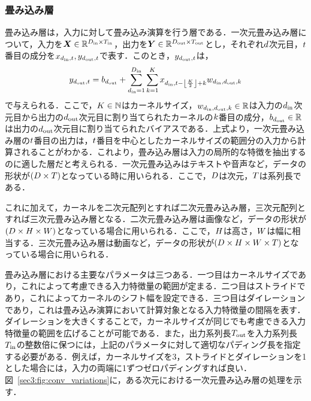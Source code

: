 \subsubsection{畳み込み層}
畳み込み層は，入力に対して畳み込み演算を行う層である．一次元畳み込み層について，入力を$\bm{X} \in \mathbb{R}^{D_{\text{in}} \times T_{\text{in}}}$，出力を$\bm{Y} \in \mathbb{R}^{D_{\text{out}} \times T_{\text{out}}}$とし，それぞれ$d$次元目，$t$番目の成分を$x_{d_{\text{in}}, t}, y_{d_{\text{out}}, t}$で表す．このとき，$y_{d_{\text{out}}, t}$は，
\begin{align}
    y_{d_{\text{out}}, t} = b_{d_{\text{out}}} + \sum_{d_{\text{in}} = 1}^{D_{\text{in}}} \sum_{k = 1}^{K} x_{d_{\text{in}}, t - \left\lfloor\frac{K}{2}\right\rfloor + k} w_{d_{\text{in}}, d_{\text{out}}, k}
\end{align}
で与えられる．ここで，$K \in \mathbb{N}$はカーネルサイズ，$w_{d_{\text{in}}, d_{\text{out}}, k} \in \mathbb{R}$は入力の$d_{\text{in}}$次元目から出力の$d_{\text{out}}$次元目に割り当てられたカーネルの$k$番目の成分，$b_{d_{\text{out}}} \in \mathbb{R}$は出力の$d_{\text{out}}$次元目に割り当てられたバイアスである．上式より，一次元畳み込み層の$t$番目の出力は，$t$番目を中心としたカーネルサイズの範囲分の入力から計算されることがわかる．これより，畳み込み層は入力の局所的な特徴を抽出するのに適した層だと考えられる．一次元畳み込みはテキストや音声など，データの形状が$\left(D \times T\right)$となっている時に用いられる．ここで，$D$は次元，$T$は系列長である．

これに加えて，カーネルを二次元配列とすれば二次元畳み込み層，三次元配列とすれば三次元畳み込み層となる．二次元畳み込み層は画像など，データの形状が$\left(D \times H \times W\right)$となっている場合に用いられる．ここで，$H$は高さ，$W$は幅に相当する．三次元畳み込み層は動画など，データの形状が$\left(D \times H \times W \times T\right)$となっている場合に用いられる．

畳み込み層における主要なパラメータは三つある．一つ目はカーネルサイズであり，これによって考慮できる入力特徴量の範囲が定まる．二つ目はストライドであり，これによってカーネルのシフト幅を設定できる．三つ目はダイレーションであり，これは畳み込み演算において計算対象となる入力特徴量の間隔を表す．ダイレーションを大きくすることで，カーネルサイズが同じでも考慮できる入力特徴量の範囲を広げることが可能である．また，出力系列長$T_{\text{out}}$を入力系列長$T_{\text{in}}$の整数倍に保つには，上記のパラメータに対して適切なパディング長を指定する必要がある．例えば，カーネルサイズを3，ストライドとダイレーションを1とした場合には，入力の両端に1ずつゼロパディングすれば良い．図~\ref{sec3:fig:conv_variations}に，ある次元における一次元畳み込み層の処理を示す．

